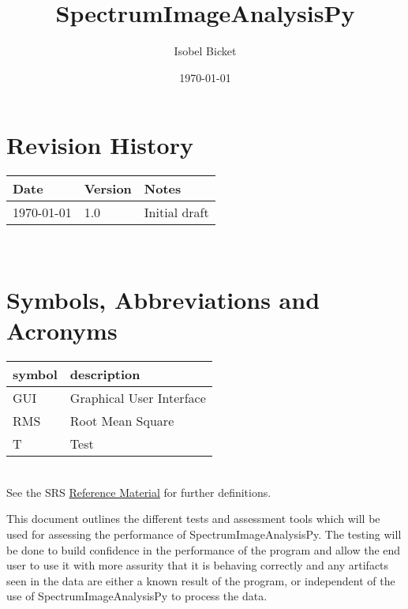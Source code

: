 \documentclass[12pt, titlepage]{article}
\newcommand{\progname}{SpectrumImageAnalysisPy}
\begin{document}

\title{SpectrumImageAnalysisPy} 
\author{Isobel Bicket}
\date{\today}
	
\maketitle


\section{Revision History}

\begin{tabularx}{\textwidth}{p{4cm}p{2cm}X}
\toprule {\bf Date} & {\bf Version} & {\bf Notes}\\
\midrule
\today & 1.0 & Initial draft\\
\bottomrule
\end{tabularx}

~\newpage

\section{Symbols, Abbreviations and Acronyms}

\renewcommand{\arraystretch}{1.2}
\begin{tabular}{l l} 
  \toprule		
  \textbf{symbol} & \textbf{description}\\
  \midrule 
  GUI & Graphical User Interface\\
  RMS & Root Mean Square\\
  T & Test\\
  \bottomrule
\end{tabular}\\

See the SRS \hyperref[SRS:RefMat]{Reference Material} for further definitions. 

\newpage

\tableofcontents

\listoftables

\newpage


This document outlines the different tests and assessment tools which will be
used for assessing the performance of \progname{}. The testing will be done to
build confidence in the performance of the program and allow the end user to use
it with more assurity that it is behaving correctly and any artifacts seen in
the data are either a known result of the program, or independent of the use of
\progname{} to process the data.
\end{document}
